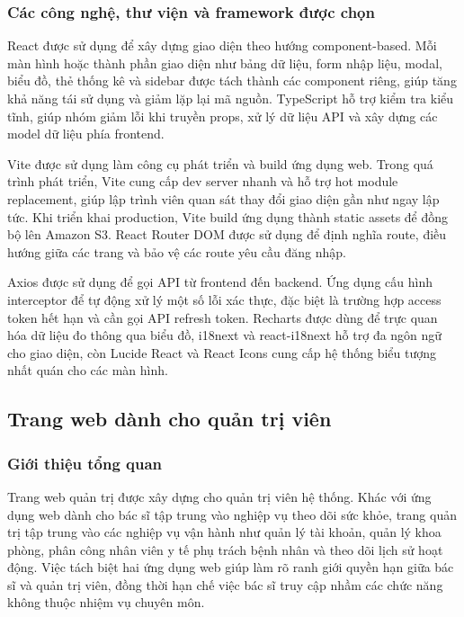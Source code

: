\subsubsection{Các công nghệ, thư viện và framework được chọn}
\par React được sử dụng để xây dựng giao diện theo hướng component-based. Mỗi màn hình hoặc thành phần giao diện như bảng dữ liệu, form nhập liệu, modal, biểu đồ, thẻ thống kê và sidebar được tách thành các component riêng, giúp tăng khả năng tái sử dụng và giảm lặp lại mã nguồn. TypeScript hỗ trợ kiểm tra kiểu tĩnh, giúp nhóm giảm lỗi khi truyền props, xử lý dữ liệu API và xây dựng các model dữ liệu phía frontend. \cite{reacthomepage}

\par Vite được sử dụng làm công cụ phát triển và build ứng dụng web. Trong quá trình phát triển, Vite cung cấp dev server nhanh và hỗ trợ hot module replacement, giúp lập trình viên quan sát thay đổi giao diện gần như ngay lập tức. Khi triển khai production, Vite build ứng dụng thành static assets để đồng bộ lên Amazon S3. React Router DOM được sử dụng để định nghĩa route, điều hướng giữa các trang và bảo vệ các route yêu cầu đăng nhập. \cite{vitedocs}

\par Axios được sử dụng để gọi API từ frontend đến backend. Ứng dụng cấu hình interceptor để tự động xử lý một số lỗi xác thực, đặc biệt là trường hợp access token hết hạn và cần gọi API refresh token. Recharts được dùng để trực quan hóa dữ liệu đo thông qua biểu đồ, i18next và react-i18next hỗ trợ đa ngôn ngữ cho giao diện, còn Lucide React và React Icons cung cấp hệ thống biểu tượng nhất quán cho các màn hình.

\subsection{Trang web dành cho quản trị viên}

\subsubsection{Giới thiệu tổng quan}
\par Trang web quản trị được xây dựng cho quản trị viên hệ thống. Khác với ứng dụng web dành cho bác sĩ tập trung vào nghiệp vụ theo dõi sức khỏe, trang quản trị tập trung vào các nghiệp vụ vận hành như quản lý tài khoản, quản lý khoa phòng, phân công nhân viên y tế phụ trách bệnh nhân và theo dõi lịch sử hoạt động. Việc tách biệt hai ứng dụng web giúp làm rõ ranh giới quyền hạn giữa bác sĩ và quản trị viên, đồng thời hạn chế việc bác sĩ truy cập nhầm các chức năng không thuộc nhiệm vụ chuyên môn.

